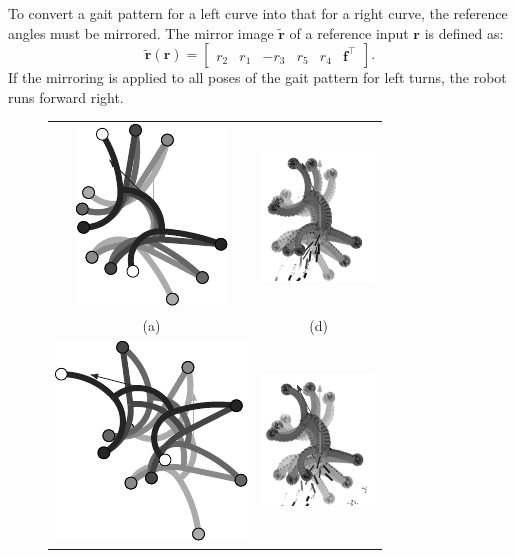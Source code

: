 \documentclass[letterpaper,10pt,conference]{ieeeconf}  %
\begin{document}
To convert a gait pattern for a left curve into that for a right curve, the reference angles must be mirrored.
The mirror image $\tilde{\bm{r}}$ of a reference input $\bm{r}$ is defined as:
\begin{equation}
\tilde{\bm{r}}(\bm{r}) = \begin{bmatrix}
r_2 & r_1 & - r_3 & r_5 & r_4  & \bm{f}^\top
\end{bmatrix} .
\end{equation}
If the mirroring is applied to all poses of the gait pattern for left turns, the robot runs forward right.


\begin{figure}
\begin{center}
\begin{tabular}{cc}
\includegraphics[scale=1]{../Pics/py/Curve_f_ori_1.pdf}&
\includegraphics[width=3cm]{../Pics/experiment/curve_a.png} \\
(a) & (d) \\ 
\includegraphics[scale=1]{../Pics/py/Curve_f_ori_01.pdf}&
\includegraphics[width=3cm]{../Pics/experiment/curve_b.png} \\

\end{tabular}
\end{center}
\end{figure}
\end{document}
